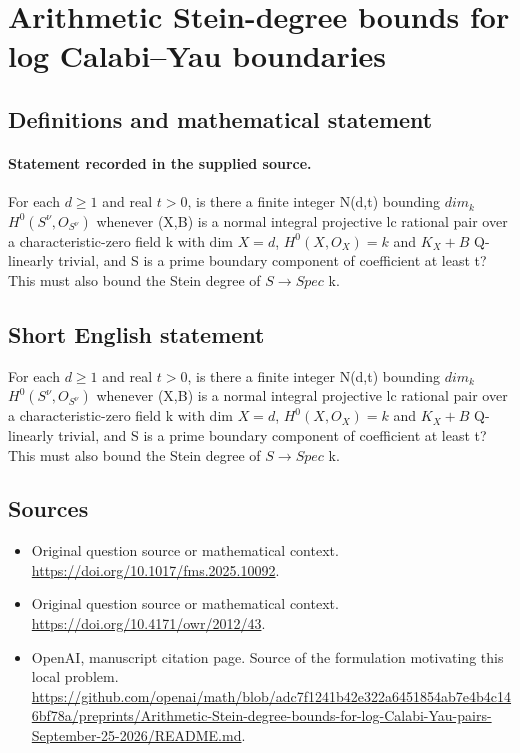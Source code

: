 \documentclass[11pt]{article}
\begin{document}
\section*{Arithmetic Stein-degree bounds for log Calabi–Yau boundaries}\label{30007013}
\subsection{Definitions and mathematical statement}
\paragraph{Statement recorded in the supplied source.}
For each $d\geq 1$ and real $t>0$, is there a finite integer N(d,t) bounding $dim_k$ $H^{0}(S^\nu ,O_{S^\nu })$ whenever (X,B) is a normal integral projective lc rational pair over a characteristic-zero field k with dim $X=d$, $H^{0}(X,O_X)=k$ and $K_X+B$ Q-linearly trivial, and S is a prime boundary component of coefficient at least t? This must also bound the Stein degree of $S\to Spec$ k.
\subsection{Short English statement}
For each $d\geq 1$ and real $t>0$, is there a finite integer N(d,t) bounding $dim_k$ $H^{0}(S^\nu ,O_{S^\nu })$ whenever (X,B) is a normal integral projective lc rational pair over a characteristic-zero field k with dim $X=d$, $H^{0}(X,O_X)=k$ and $K_X+B$ Q-linearly trivial, and S is a prime boundary component of coefficient at least t? This must also bound the Stein degree of $S\to Spec$ k.
\subsection{Sources}
\begin{itemize}
\item[S1] Original question source or mathematical context.
\url{https://doi.org/10.1017/fms.2025.10092}.
\item[S2] Original question source or mathematical context.
\url{https://doi.org/10.4171/owr/2012/43}.
\item[S3] OpenAI, manuscript citation page. Source of the formulation motivating this local problem.
\url{https://github.com/openai/math/blob/adc7f1241b42e322a6451854ab7e4b4c146bf78a/preprints/Arithmetic-Stein-degree-bounds-for-log-Calabi-Yau-pairs-September-25-2026/README.md}.
\end{itemize}
\end{document}
